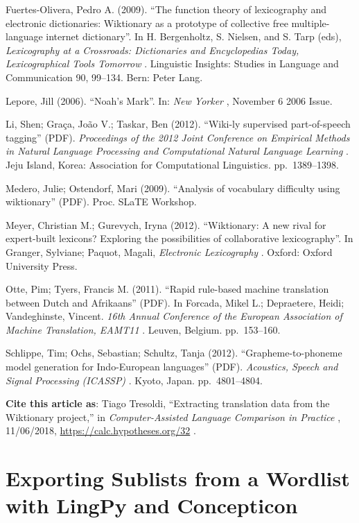 \documentclass[
  english,
  a4paper,
  oneside,tablecaptionabove
]{scrbook}
\begin{document}
Fuertes-Olivera, Pedro A. (2009). \enquote{The function theory of
lexicography and electronic dictionaries: Wiktionary as a prototype of
collective free multiple-language internet dictionary}. In H.
Bergenholtz, S. Nielsen, and S. Tarp (eds), \emph{Lexicography at a
Crossroads: Dictionaries and Encyclopedias Today, Lexicographical Tools
Tomorrow} . Linguistic Insights: Studies in Language and Communication
90, 99--134. Bern: Peter Lang.

Lepore, Jill (2006). \enquote{Noah's Mark}. In: \emph{New Yorker} ,
November 6 2006 Issue.

Li, Shen; Graça, João V.; Taskar, Ben (2012). \enquote{Wiki-ly
supervised part-of-speech tagging} (PDF). \emph{Proceedings of the 2012
Joint Conference on Empirical Methods in Natural Language Processing and
Computational Natural Language Learning} . Jeju Island, Korea:
Association for Computational Linguistics. pp.~1389--1398.

Medero, Julie; Ostendorf, Mari (2009). \enquote{Analysis of vocabulary
difficulty using wiktionary} (PDF). Proc. SLaTE Workshop.

Meyer, Christian M.; Gurevych, Iryna (2012). \enquote{Wiktionary: A new
rival for expert-built lexicons? Exploring the possibilities of
collaborative lexicography}. In Granger, Sylviane; Paquot, Magali,
\emph{Electronic Lexicography} . Oxford: Oxford University Press.

Otte, Pim; Tyers, Francis M. (2011). \enquote{Rapid rule-based machine
translation between Dutch and Afrikaans} (PDF). In Forcada, Mikel L.;
Depraetere, Heidi; Vandeghinste, Vincent. \emph{16th Annual Conference
of the European Association of Machine Translation, EAMT11} . Leuven,
Belgium. pp.~153--160.

Schlippe, Tim; Ochs, Sebastian; Schultz, Tanja (2012).
\enquote{Grapheme-to-phoneme model generation for Indo-European
languages} (PDF). \emph{Acoustics, Speech and Signal Processing
(ICASSP)} . Kyoto, Japan. pp.~4801--4804.

\textbf{Cite this article as}: Tiago Tresoldi, ``Extracting translation
data from the Wiktionary project,'' in \emph{Computer-Assisted Language
Comparison in Practice} , 11/06/2018,
\url{https://calc.hypotheses.org/32} .

\hypertarget{exporting-sublists-from-a-wordlist-with-lingpy-and-concepticon}{%
\chapter{Exporting Sublists from a Wordlist with LingPy and
Concepticon}\label{exporting-sublists-from-a-wordlist-with-lingpy-and-concepticon}}
\end{document}
